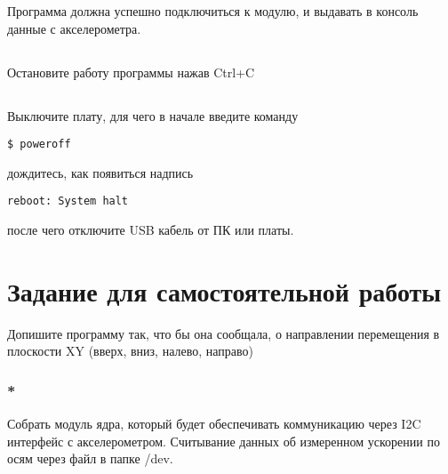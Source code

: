 Программа должна успешно подключиться к модулю, и выдавать в консоль данные с акселерометра.

\subsection{}Остановите работу программы нажав Ctrl+C

\subsection{} Выключите плату, для чего в начале введите команду
\begin{lstlisting}[style=bash]
	$ poweroff
\end{lstlisting}
дождитесь, как появиться надпись
\begin{lstlisting}[style=stdout]
	reboot: System halt
\end{lstlisting}
после чего отключите USB кабель от ПК или платы. 

\section{Задание для самостоятельной работы}

Допишите программу так, что бы она сообщала, о направлении перемещения в плоскости XY (вверх, вниз, налево, направо)

\subsubsection{*} Собрать модуль ядра, который будет обеспечивать коммуникацию через I2C интерфейс с акселерометром. Считывание данных об измеренном ускорении по осям через файл в папке /dev.